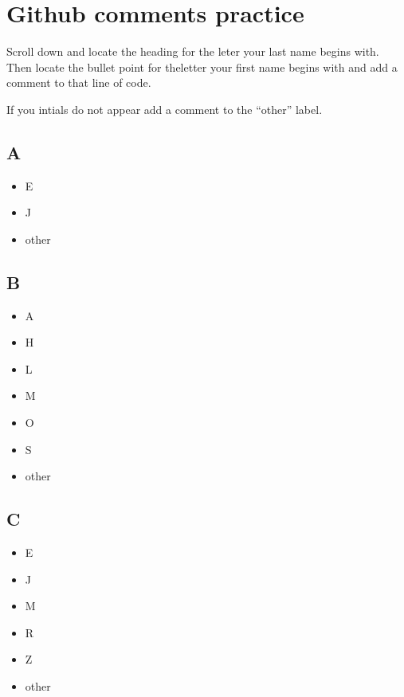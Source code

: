 \documentclass[
]{book}
\providecommand{\tightlist}{%
  \setlength{\itemsep}{0pt}\setlength{\parskip}{0pt}}
\begin{document}
\hypertarget{github-comments-practice}{%
\chapter{Github comments practice}\label{github-comments-practice}}

Scroll down and locate the heading for the leter your last name begins with. Then locate the bullet point for theletter your first name begins with and add a comment to that line of code.

If you intials do not appear add a comment to the ``other'' label.

\hypertarget{a}{%
\section{A}\label{a}}

\begin{itemize}
\tightlist
\item
  E
\item
  J
\item
  other
\end{itemize}

\hypertarget{b}{%
\section{B}\label{b}}

\begin{itemize}
\tightlist
\item
  A
\item
  H
\item
  L
\item
  M
\item
  O
\item
  S
\item
  other
\end{itemize}

\hypertarget{c}{%
\section{C}\label{c}}

\begin{itemize}
\tightlist
\item
  E
\item
  J
\item
  M
\item
  R
\item
  Z
\item
  other
\end{itemize}
\end{document}
